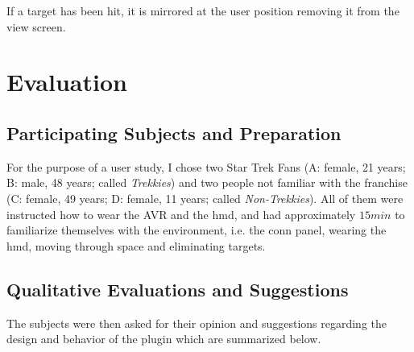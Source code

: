 \documentclass[hyperref, bachelorofscience]{cgvpub}
\begin{document}
If a target has been hit, it is mirrored at the user position removing it from the view screen. 

\chapter{Evaluation}
\section{Participating Subjects and Preparation}
For the purpose of a user study, I chose two Star Trek Fans (A: female, 21 years; B: male, 48 years; called \emph{Trekkies}) and two people not familiar with the franchise (C: female, 49 years; D: female, 11 years; called \emph{Non-Trekkies}). All of them were instructed how to wear the \Gls{AVR} and the \acrshort{hmd}, and had approximately $ 15min $ to familiarize themselves with the environment, i.e. the conn panel, wearing the \acrshort{hmd}, moving through space and eliminating targets. 

\section{Qualitative Evaluations and Suggestions}
The subjects were then asked for their opinion and suggestions regarding the design and behavior of the plugin which are summarized below.
\end{document}
